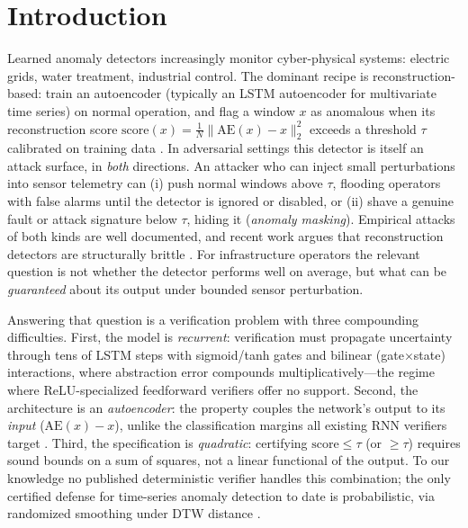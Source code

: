\documentclass{article} %
\newcommand{\score}{\mathrm{score}}
\begin{document}
\section{Introduction}
\label{sec:intro}

Learned anomaly detectors increasingly monitor cyber-physical systems:
electric grids, water treatment, industrial control. The dominant
recipe is reconstruction-based: train an autoencoder (typically an LSTM
autoencoder for multivariate time series) on normal operation, and flag
a window $x$ as anomalous when its reconstruction score
$\score(x) = \tfrac{1}{N}\lVert \mathrm{AE}(x) - x\rVert_2^2$ exceeds a
threshold $\tau$ calibrated on training data
\citep{malhotra2016lstm,hundman2018detecting,su2019robust}.
In adversarial settings this detector is itself an attack surface, in
\emph{both} directions. An attacker who can inject small perturbations
into sensor telemetry can (i) push normal windows above $\tau$,
flooding operators with false alarms until the detector is ignored or
disabled, or (ii) shave a genuine fault or attack signature below
$\tau$, hiding it (\emph{anomaly masking}). Empirical attacks of both
kinds are well documented, and recent work argues that reconstruction
detectors are structurally brittle \citep{bouman2025unreliable}. For
infrastructure operators the relevant question is not whether the
detector performs well on average, but what can be \emph{guaranteed}
about its output under bounded sensor perturbation.

Answering that question is a verification problem with three
compounding difficulties. First, the model is \emph{recurrent}:
verification must propagate uncertainty through tens of LSTM steps with
sigmoid/tanh gates and bilinear (gate$\times$state) interactions, where
abstraction error compounds multiplicatively---the regime where
ReLU-specialized feedforward verifiers offer no support. Second, the
architecture is an \emph{autoencoder}: the property couples the
network's output to its \emph{input} ($\mathrm{AE}(x)-x$), unlike the
classification margins all existing RNN verifiers target
\citep{ko2019popqorn,ryou2021scalable,jacoby2020rnnverify,du2021certrnn}.
Third, the specification is \emph{quadratic}: certifying
$\score \le \tau$ (or $\ge \tau$) requires sound bounds on a sum of
squares, not a linear functional of the output. To our knowledge no
published deterministic verifier handles this combination; the only
certified defense for time-series anomaly detection to date is
probabilistic, via randomized smoothing under DTW distance
\citep{liu2026dtw}.
\end{document}
